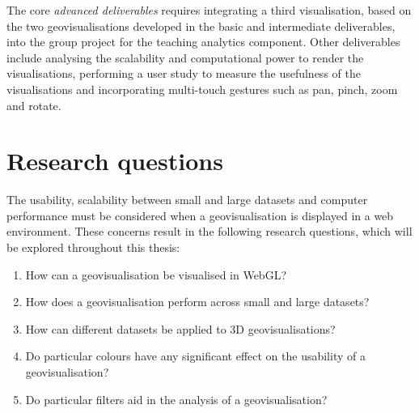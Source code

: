 {	The core \emph{advanced deliverables} requires integrating a third visualisation, based on the two geovisualisations developed in the basic and intermediate deliverables, into the group project for the teaching analytics component. Other deliverables include analysing the scalability and computational power to render the visualisations, performing a user study to measure the usefulness of the visualisations and incorporating multi-touch gestures such as pan, pinch, zoom and rotate.
	
}

\section{Research questions} {
\label{sec:research_questions}


	The usability, scalability between small and large datasets and computer performance must be considered when a geovisualisation is displayed in a web environment. These concerns result in the following research questions, which will be explored throughout this thesis:

	\begin{enumerate}
		\item How can a geovisualisation be visualised in WebGL?
		\item How does a geovisualisation perform across small and large datasets?
		\item How can different datasets be applied to 3D geovisualisations?
		\item Do particular colours have any significant effect on the usability of a geovisualisation?
		\item Do particular filters aid in the analysis of a geovisualisation?
	\end{enumerate}

}
